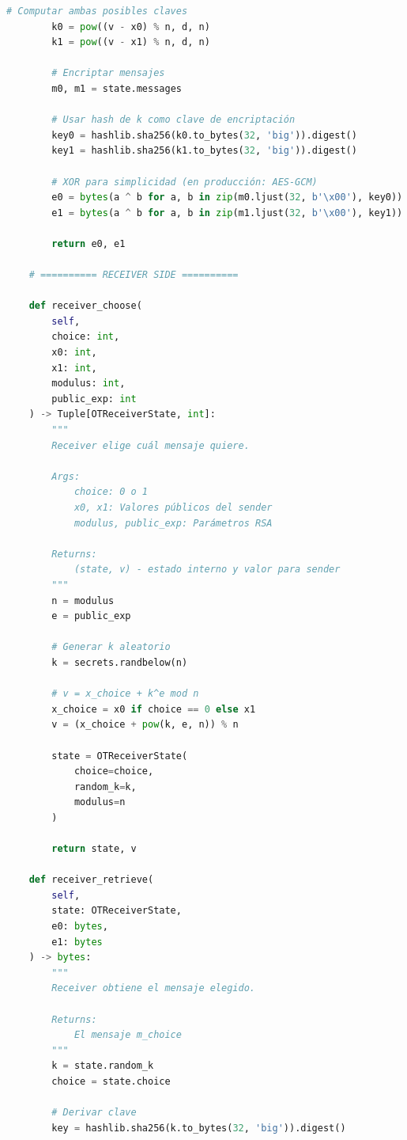 \documentclass[11pt,a4paper,twoside]{book}
\theoremstyle{definition}
\theoremstyle{remark}
\begin{document}
\begin{lstlisting}[language=Python, caption={Implementación de Oblivious Transfer}]
        # Computar ambas posibles claves
        k0 = pow((v - x0) % n, d, n)
        k1 = pow((v - x1) % n, d, n)
        
        # Encriptar mensajes
        m0, m1 = state.messages
        
        # Usar hash de k como clave de encriptación
        key0 = hashlib.sha256(k0.to_bytes(32, 'big')).digest()
        key1 = hashlib.sha256(k1.to_bytes(32, 'big')).digest()
        
        # XOR para simplicidad (en producción: AES-GCM)
        e0 = bytes(a ^ b for a, b in zip(m0.ljust(32, b'\x00'), key0))
        e1 = bytes(a ^ b for a, b in zip(m1.ljust(32, b'\x00'), key1))
        
        return e0, e1
    
    # ========== RECEIVER SIDE ==========
    
    def receiver_choose(
        self,
        choice: int,
        x0: int,
        x1: int,
        modulus: int,
        public_exp: int
    ) -> Tuple[OTReceiverState, int]:
        """
        Receiver elige cuál mensaje quiere.
        
        Args:
            choice: 0 o 1
            x0, x1: Valores públicos del sender
            modulus, public_exp: Parámetros RSA
        
        Returns:
            (state, v) - estado interno y valor para sender
        """
        n = modulus
        e = public_exp
        
        # Generar k aleatorio
        k = secrets.randbelow(n)
        
        # v = x_choice + k^e mod n
        x_choice = x0 if choice == 0 else x1
        v = (x_choice + pow(k, e, n)) % n
        
        state = OTReceiverState(
            choice=choice,
            random_k=k,
            modulus=n
        )
        
        return state, v
    
    def receiver_retrieve(
        self,
        state: OTReceiverState,
        e0: bytes,
        e1: bytes
    ) -> bytes:
        """
        Receiver obtiene el mensaje elegido.
        
        Returns:
            El mensaje m_choice
        """
        k = state.random_k
        choice = state.choice
        
        # Derivar clave
        key = hashlib.sha256(k.to_bytes(32, 'big')).digest()
        

\end{lstlisting}
\end{document}
